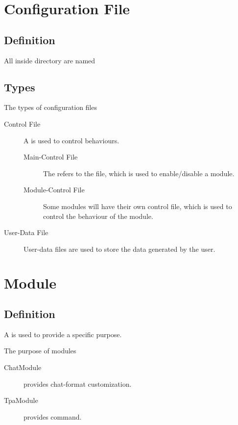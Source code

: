 \section{Configuration File}

\subsection{Definition}
All  inside  directory are named 

\subsection{Types}
\begin{note}{The types of configuration files}
    \begin{description}
        \item[Control File] {A  is used to control behaviours.}
        \begin{description}
            \item[Main-Control File] The  refers to the  file, which is used to enable/disable a module.
            \item[Module-Control File] Some modules will have their own control file, which is used to control the behaviour of the module.
        \end{description}

        \item[User-Data File] User-data files are used to store the data generated by the user.
    \end{description}
\end{note}


\clearpage


\section{Module}

\subsection{Definition}
A  is used to provide a specific purpose.
\begin{example}{The purpose of modules}
    \begin{description}
        \item [ChatModule] provides chat-format customization.
        \item [TpaModule] provides  command.
    \end{description}
\end{example}

